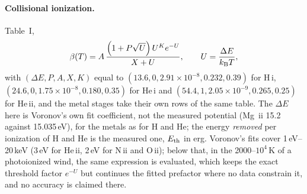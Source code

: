 \paragraph{Collisional ionization.} \citet{Voronov1997} Table~I,
\begin{equation}
\beta(T) = A\,\frac{\left(1+P\sqrt{U}\right)U^{K}e^{-U}}{X+U},
\qquad U = \frac{\Delta E}{k_{\rm B}T},
\label{eq:ion:voronov}
\end{equation}
with $(\Delta E,P,A,X,K)$ equal to $(13.6,0,2.91\times10^{-8},0.232,0.39)$
for H\,{\sc i}, $(24.6,0,1.75\times10^{-8},0.180,0.35)$ for He\,{\sc i} and
$(54.4,1,2.05\times10^{-9},0.265,0.25)$ for He\,{\sc ii}, and the metal
stages take their own rows of the same table. The $\Delta E$
here is Voronov's own fit coefficient, not the measured potential (Mg\,{\sc
ii} 15.2 against 15.035\,eV), for the metals as for H and He; the
energy \emph{removed} per ionization of H and He is the measured one,
$E_{{\rm th}}$ in erg. Voronov's fits cover 1\,eV--20\,keV (3\,eV for
He\,{\sc ii}, 2\,eV for N\,{\sc ii} and O\,{\sc ii}); below that, in the
2000--$10^4$\,K of a photoionized wind, the same expression is evaluated,
which keeps the exact threshold factor $e^{-U}$ but continues the fitted
prefactor where no data constrain it, and no accuracy is claimed there.

